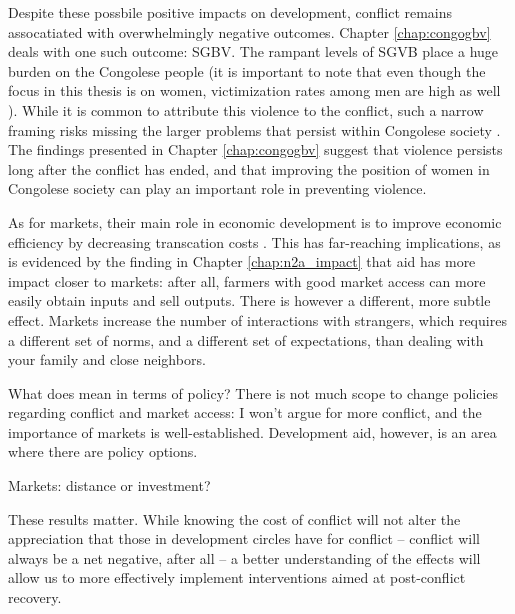 Despite these possbile positive impacts on development, conflict remains assocatiated with overwhelmingly negative outcomes. Chapter \ref{chap:congogbv} deals with one such outcome: SGBV. The rampant levels of SGVB place a huge burden on the Congolese people (it is important to note that even though the focus in this thesis is on women, victimization rates among men are high as well ). While it is common to attribute this violence to the conflict, such a narrow framing risks missing the larger problems that persist within Congolese society \citep{Autesserre2012a}. The findings presented in Chapter \ref{chap:congogbv} suggest that violence persists long after the conflict has ended, and that improving the position of women in Congolese society can play an important role in preventing violence.

As for markets, their main role in economic development is to improve economic efficiency by decreasing transcation costs . This has far-reaching implications, as is evidenced by the finding in Chapter \ref{chap:n2a_impact} that aid has more impact closer to markets: after all, farmers with good market access can more easily obtain inputs and sell outputs. There is however a different, more subtle effect. Markets increase the number of interactions with strangers, which requires a different set of norms, and a different set of expectations, than dealing with your family and close neighbors. 

What does mean in terms of policy? There is not much scope to change policies regarding conflict and market access: I won't argue for more conflict, and the importance of markets is well-established. Development aid, however, is an area where there are policy options. 

Markets: distance or investment?

These results matter. While knowing the cost of conflict will not alter the appreciation that those in development circles have for conflict -- conflict will always be a net negative, after all -- a better understanding of the effects will allow us to more effectively implement interventions aimed at post-conflict recovery. 





%